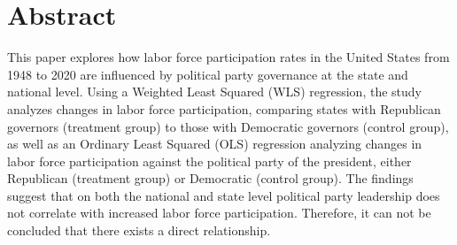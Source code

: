 \chapter{Abstract}

This paper explores how labor force participation rates in the United States from 1948 to 2020 are influenced by political party governance at the state and national level. Using a Weighted Least Squared (WLS) regression, the study analyzes changes in labor force participation, comparing states with Republican governors (treatment group) to those with Democratic governors (control group), as well as an Ordinary Least Squared (OLS) regression analyzing changes in labor force participation against the political party of the president, either Republican (treatment group) or Democratic (control group). The findings suggest that on both the national and state level political party leadership does not correlate with increased labor force participation. Therefore, it can not be concluded that there exists a direct relationship.